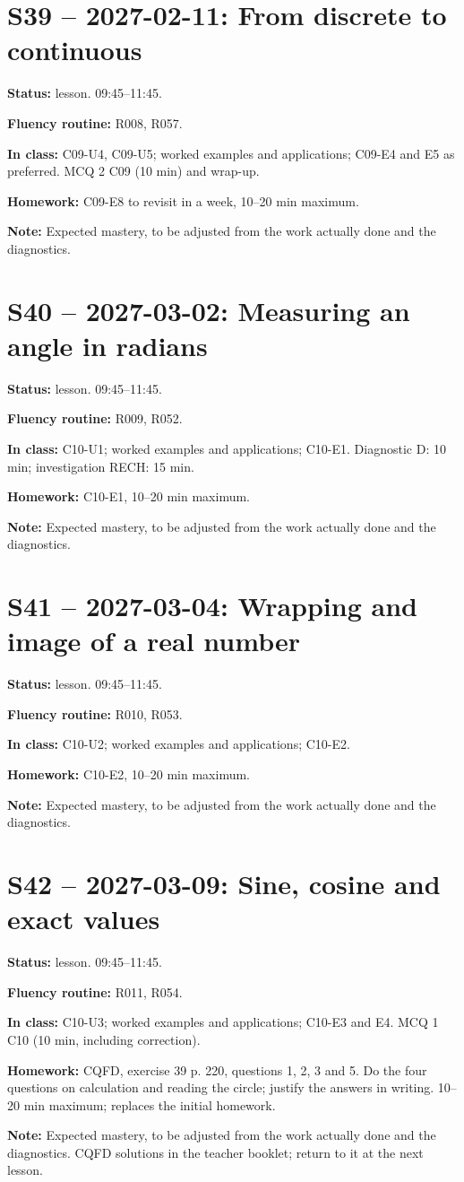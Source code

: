\section*{S39 -- 2027-02-11: From discrete to continuous}
\textbf{Status:} lesson. 09:45–11:45.\par\textbf{Fluency routine:} R008, R057.\par\textbf{In class:} C09-U4, C09-U5; worked examples and applications; C09-E4 and E5 as preferred.  MCQ 2 C09 (10 min) and wrap-up.\par\textbf{Homework:} C09-E8 to revisit in a week, 10–20 min maximum.\par\textbf{Note:} Expected mastery, to be adjusted from the work actually done and the diagnostics.
\section*{S40 -- 2027-03-02: Measuring an angle in radians}
\textbf{Status:} lesson. 09:45–11:45.\par\textbf{Fluency routine:} R009, R052.\par\textbf{In class:} C10-U1; worked examples and applications; C10-E1. Diagnostic D: 10 min; investigation RECH: 15 min.\par\textbf{Homework:} C10-E1, 10–20 min maximum.\par\textbf{Note:} Expected mastery, to be adjusted from the work actually done and the diagnostics.
\section*{S41 -- 2027-03-04: Wrapping and image of a real number}
\textbf{Status:} lesson. 09:45–11:45.\par\textbf{Fluency routine:} R010, R053.\par\textbf{In class:} C10-U2; worked examples and applications; C10-E2. \par\textbf{Homework:} C10-E2, 10–20 min maximum.\par\textbf{Note:} Expected mastery, to be adjusted from the work actually done and the diagnostics.
\section*{S42 -- 2027-03-09: Sine, cosine and exact values}
\textbf{Status:} lesson. 09:45–11:45.\par\textbf{Fluency routine:} R011, R054.\par\textbf{In class:} C10-U3; worked examples and applications; C10-E3 and E4.  MCQ 1 C10 (10 min, including correction).\par\textbf{Homework:} CQFD, exercise 39 p. 220, questions 1, 2, 3 and 5. Do the four questions on calculation and reading the circle; justify the answers in writing. 10–20 min maximum; replaces the initial homework.\par\textbf{Note:} Expected mastery, to be adjusted from the work actually done and the diagnostics. CQFD solutions in the teacher booklet; return to it at the next lesson.
